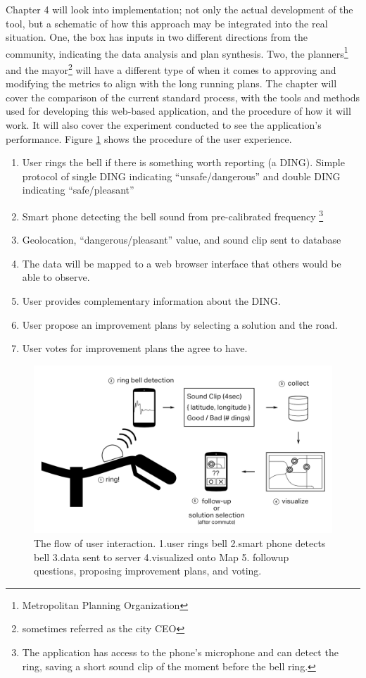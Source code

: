 Chapter 4 will look into implementation; not only the actual development of the tool, but a schematic of how this approach may be integrated into the real situation. 
 One, the box has inputs in two different directions from the community, indicating the data analysis and plan synthesis. Two, the planners\footnote{Metropolitan Planning Organization} and the mayor\footnote{sometimes referred as the city CEO} will have a different type of  when it comes to approving and modifying the metrics to align with the long running plans. The chapter will cover the comparison of the current standard process, with the tools and methods used for developing this web-based application, and the procedure of how it will work. It will also cover the  experiment conducted to see the application's performance. Figure \ref{fig:how} shows the procedure of the user experience. 
\begin{enumerate}
    \item User rings the bell if there is something worth reporting (a DING). Simple protocol of single DING indicating ``unsafe/dangerous'' and double DING indicating ``safe/pleasant''
    \item Smart phone detecting the bell sound from pre-calibrated frequency \footnote{The application has access to the phone's microphone and can detect the ring, saving a short sound clip of the moment before the bell ring. }
    \item Geolocation, ``dangerous/pleasant'' value, and sound clip sent to database
    \item The data will be mapped to a web browser interface that others would be able to observe.
    \item User provides complementary information about the DING.
    \item User propose an improvement plans by selecting a solution and the road.
    \item User votes for improvement plans the agree to have.
\end{enumerate}
\begin{figure}[!htb]
    \includegraphics[width=\textwidth]{chapters/1/fig/how_it_works.png}               
    \caption[how bike bump works]{
        The flow of user interaction. 1.user rings bell 2.smart phone detects bell 3.data sent to server 4.visualized onto Map 5. followup questions, proposing improvement plans, and voting.
    }
    \label{fig:how}
\end{figure}
